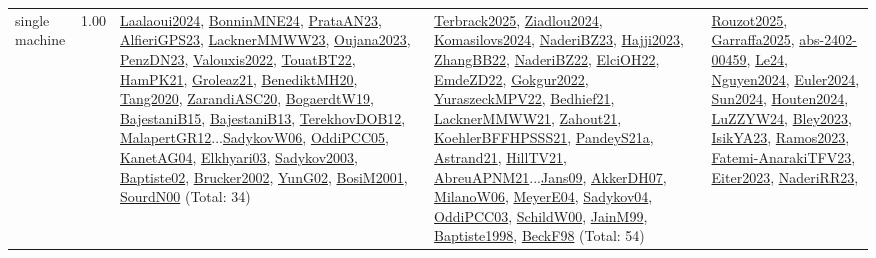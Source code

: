 {\begin{longtable}{p{3cm}r>{\raggedright\arraybackslash}p{6cm}>{\raggedright\arraybackslash}p{6cm}>{\raggedright\arraybackslash}p{8cm}}
\index{single machine}\index{Classification!single machine}single machine &  1.00 & \hyperref[detail:Laalaoui2024]{Laalaoui2024}, \hyperref[detail:BonninMNE24]{BonninMNE24}, \hyperref[detail:PrataAN23]{PrataAN23}, \hyperref[detail:AlfieriGPS23]{AlfieriGPS23}, \hyperref[detail:LacknerMMWW23]{LacknerMMWW23}, \hyperref[detail:Oujana2023]{Oujana2023}, \hyperref[detail:PenzDN23]{PenzDN23}, \hyperref[detail:Valouxis2022]{Valouxis2022}, \hyperref[detail:TouatBT22]{TouatBT22}, \hyperref[detail:HamPK21]{HamPK21}, \hyperref[detail:Groleaz21]{Groleaz21}, \hyperref[detail:BenediktMH20]{BenediktMH20}, \hyperref[detail:Tang2020]{Tang2020}, \hyperref[detail:ZarandiASC20]{ZarandiASC20}, \hyperref[detail:BogaerdtW19]{BogaerdtW19}, \hyperref[detail:BajestaniB15]{BajestaniB15}, \hyperref[detail:BajestaniB13]{BajestaniB13}, \hyperref[detail:TerekhovDOB12]{TerekhovDOB12}, \hyperref[detail:MalapertGR12]{MalapertGR12}...\hyperref[detail:SadykovW06]{SadykovW06}, \hyperref[detail:OddiPCC05]{OddiPCC05}, \hyperref[detail:KanetAG04]{KanetAG04}, \hyperref[detail:Elkhyari03]{Elkhyari03}, \hyperref[detail:Sadykov2003]{Sadykov2003}, \hyperref[detail:Baptiste02]{Baptiste02}, \hyperref[detail:Brucker2002]{Brucker2002}, \hyperref[detail:YunG02]{YunG02}, \hyperref[detail:BosiM2001]{BosiM2001}, \hyperref[detail:SourdN00]{SourdN00} (Total: 34) & \hyperref[detail:Terbrack2025]{Terbrack2025}, \hyperref[detail:Ziadlou2024]{Ziadlou2024}, \hyperref[detail:Komasilovs2024]{Komasilovs2024}, \hyperref[detail:NaderiBZ23]{NaderiBZ23}, \hyperref[detail:Hajji2023]{Hajji2023}, \hyperref[detail:ZhangBB22]{ZhangBB22}, \hyperref[detail:NaderiBZ22]{NaderiBZ22}, \hyperref[detail:ElciOH22]{ElciOH22}, \hyperref[detail:EmdeZD22]{EmdeZD22}, \hyperref[detail:Gokgur2022]{Gokgur2022}, \hyperref[detail:YuraszeckMPV22]{YuraszeckMPV22}, \hyperref[detail:Bedhief21]{Bedhief21}, \hyperref[detail:LacknerMMWW21]{LacknerMMWW21}, \hyperref[detail:Zahout21]{Zahout21}, \hyperref[detail:KoehlerBFFHPSSS21]{KoehlerBFFHPSSS21}, \hyperref[detail:PandeyS21a]{PandeyS21a}, \hyperref[detail:Astrand21]{Astrand21}, \hyperref[detail:HillTV21]{HillTV21}, \hyperref[detail:AbreuAPNM21]{AbreuAPNM21}...\hyperref[detail:Jans09]{Jans09}, \hyperref[detail:AkkerDH07]{AkkerDH07}, \hyperref[detail:MilanoW06]{MilanoW06}, \hyperref[detail:MeyerE04]{MeyerE04}, \hyperref[detail:Sadykov04]{Sadykov04}, \hyperref[detail:OddiPCC03]{OddiPCC03}, \hyperref[detail:SchildW00]{SchildW00}, \hyperref[detail:JainM99]{JainM99}, \hyperref[detail:Baptiste1998]{Baptiste1998}, \hyperref[detail:BeckF98]{BeckF98} (Total: 54) & \hyperref[detail:Rouzot2025]{Rouzot2025}, \hyperref[detail:Garraffa2025]{Garraffa2025}, \hyperref[detail:abs-2402-00459]{abs-2402-00459}, \hyperref[detail:Le24]{Le24}, \hyperref[detail:Nguyen2024]{Nguyen2024}, \hyperref[detail:Euler2024]{Euler2024}, \hyperref[detail:Sun2024]{Sun2024}, \hyperref[detail:Houten2024]{Houten2024}, \hyperref[detail:LuZZYW24]{LuZZYW24}, \hyperref[detail:Bley2023]{Bley2023}, \hyperref[detail:IsikYA23]{IsikYA23}, \hyperref[detail:Ramos2023]{Ramos2023}, \hyperref[detail:Fatemi-AnarakiTFV23]{Fatemi-AnarakiTFV23}, \hyperref[detail:Eiter2023]{Eiter2023}, \hyperref[detail:NaderiRR23]{NaderiRR23}, 
\end{longtable}}
